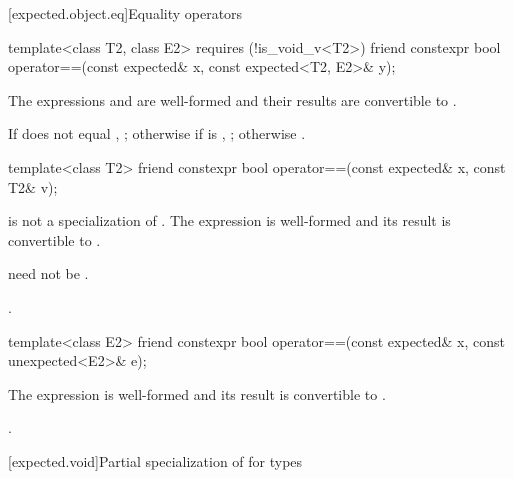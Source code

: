 [expected.object.eq]{Equality operators}

%
\begin{itemdecl}
template<class T2, class E2> requires (!is_void_v<T2>)
  friend constexpr bool operator==(const expected& x, const expected<T2, E2>& y);
\end{itemdecl}

\begin{itemdescr}
\pnum
\constraints
The expressions  and 
are well-formed and their results are convertible to .

\pnum
\returns
If  does not equal , ;
otherwise if  is , ;
otherwise .
\end{itemdescr}

%
\begin{itemdecl}
template<class T2> friend constexpr bool operator==(const expected& x, const T2& v);
\end{itemdecl}

\begin{itemdescr}
\pnum
\constraints
{} is not a specialization of .
The expression  is well-formed and
its result is convertible to .
\begin{note}
 need not be .
\end{note}

\pnum
\returns
{}.
\end{itemdescr}

%
\begin{itemdecl}
template<class E2> friend constexpr bool operator==(const expected& x, const unexpected<E2>& e);
\end{itemdecl}

\begin{itemdescr}
\pnum
\constraints
The expression  is well-formed and
its result is convertible to .

\pnum
\returns
{}.
\end{itemdescr}

[expected.void]{Partial specialization of  for  types}

